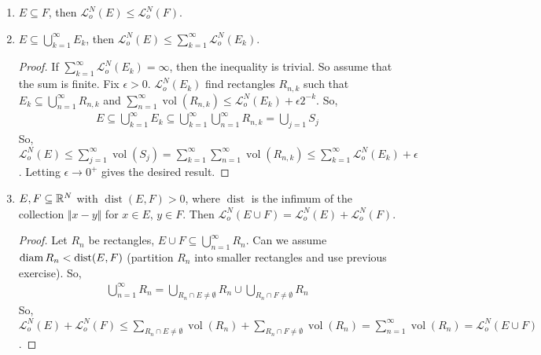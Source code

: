 \documentclass{report}
\DeclareMathOperator{\vol}{vol}
\DeclareMathOperator{\dist}{dist}
\begin{document}
\begin{enumerate}
    \item $E \subseteq F$, then $\mathcal L_o^N(E) \leq \mathcal L_o^N(F)$.
    \item $E \subseteq \bigcup_{k=1}^\infty E_k$, then $\mathcal L_o^N(E) \leq \sum_{k=1}^\infty \mathcal L_o^N(E_k)$.
    \begin{proof}
        If $\sum_{k=1}^\infty \mathcal L_o^N(E_k) = \infty$, then the inequality is trivial. So assume that the sum is finite. Fix $\epsilon > 0$. $\mathcal L_o^N(E_k)$ find rectangles $R_{n, k}$ such that $E_k \subseteq \bigcup_{n=1}^\infty R_{n, k}$ and $\sum_{n=1}^\infty \vol(R_{n, k}) \leq \mathcal L_o^N(E_k) + \epsilon 2^{-k}$. So,
        \begin{align*}
            E \subseteq \bigcup_{k=1}^\infty E_k \subseteq \bigcup_{k=1}^\infty \bigcup_{n=1}^\infty R_{n, k} = \bigcup_{j = 1}S_j
        \end{align*}
        So, $\mathcal L_o^N(E) \leq \sum_{j=1}^\infty \vol(S_j) = \sum_{k=1}^\infty \sum_{n=1}^\infty \vol(R_{n, k}) \leq \sum_{k=1}^\infty \mathcal L_o^N(E_k) + \epsilon$.
        Letting $\epsilon \to 0^+$ gives the desired result.
    \end{proof}
    \item $E, F \subseteq \RR^N$ with $\dist(E, F) > 0$, where $\dist$ is the infimum of the collection $\Vert x- y \Vert$ for $x \in E$, $y \in F$. Then $\mathcal L_o^N(E \cup F) = \mathcal L_o^N(E) + \mathcal L_o^N(F)$.
    \begin{proof}
        Let $R_n$ be rectangles, $E \cup F \subseteq \bigcup_{n=1}^\infty R_n$. Can we assume $\diam R_n < \dist(E, F)$ (partition $R_n$ into smaller rectangles and use previous exercise). So,
        \begin{align*}
            \bigcup_{n=1}^\infty R_n = \bigcup_{R_n \cap E \neq \emptyset} R_n \cup \bigcup_{R_n \cap F \neq \emptyset} R_n
        \end{align*}
        So, $\mathcal L_o^N(E) + \mathcal L_o^N(F) \leq \sum_{R_n \cap E \neq \emptyset} \vol(R_n) + \sum_{R_n \cap F \neq \emptyset} \vol(R_n) = \sum_{n=1}^\infty \vol(R_n) = \mathcal L_o^N(E \cup F)$.
    \end{proof}
\end{enumerate}
\newpage
{}
\end{document}
